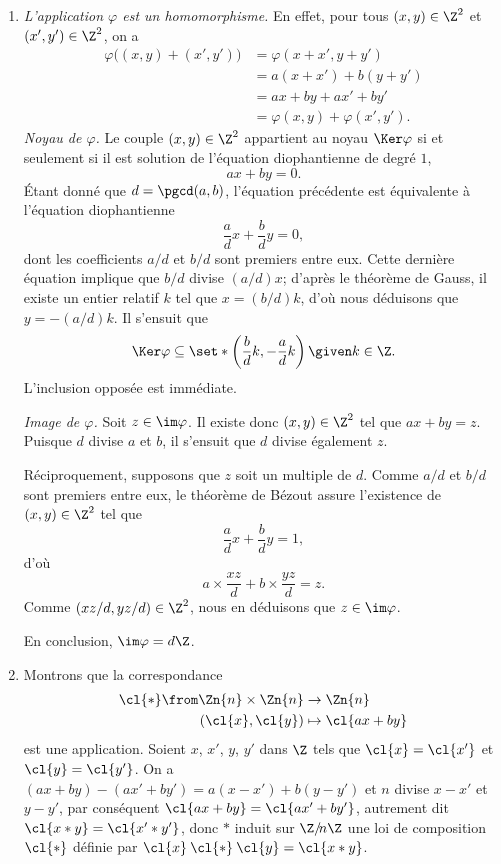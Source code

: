 \begin{enumerate}
  \item %
    \emph{L'application $\varphi$ est un homomorphisme.}
    En effet, pour tous $(x,y)\in\Z^2$ et $(x',y')\in\Z^2$, on a
    \begin{align*}
      \varphi \bigl((x,y)+(x',y')\bigr) 
      &= \varphi(x+x',y+y')  \\
      &= a(x+x')+b(y+y') \\
      &= ax + by + ax' + by' \\
      &= \varphi(x,y) + \varphi(x',y').
    \end{align*}
    \emph{Noyau de $\varphi$.}
    Le couple $(x,y)\in\Z^2$ appartient au noyau $\Ker \varphi$ si et seulement si il est solution de l'équation diophantienne de degré $1$,
    \[
      ax + by = 0.
    \]
    Étant donné que $d = \pgcd(a,b)$, l'équation précédente est équivalente à l'équation diophantienne
    \[
      \frac{a}{d}x + \frac{b}{d}y = 0,
    \]
    dont les coefficients $a/d$ et $b/d$ sont premiers entre eux.
    Cette dernière équation implique que $b/d$ divise $(a/d)x$; d'après le théorème de Gauss, il existe un entier relatif $k$ tel que $x = (b/d) k$, d'où nous déduisons que $y = -(a/d)k$.
    Il s'ensuit que 
    \[
      \Ker \varphi \subseteq \set*{\left(\frac{b}{d}k, -\frac{a}{d}k\right) \given k\in\Z}.
    \]
    L'inclusion opposée est immédiate.

    \emph{Image de $\varphi$.}
    Soit $z\in\im\varphi$. 
    Il existe donc $(x,y)\in\Z^2$ tel que $ax + by = z$.
    Puisque $d$ divise $a$ et $b$, il s'ensuit que $d$ divise également $z$.

    Réciproquement, supposons que $z$ soit un multiple de $d$.
    Comme $a/d$ et $b/d$ sont premiers entre eux, le théorème de Bézout assure l'existence de $(x,y)\in\Z^2$ tel que
    \[
      \frac{a}{d} x + \frac{b}{d} y = 1,
    \]
    d'où
    \[
      a\times  \frac{xz}{d} + b\times \frac{yz}{d} = z.
    \]
    Comme $(xz/d,yz/d)\in\Z^2$, nous en déduisons que $z\in\im\varphi$. 
    
    En conclusion, $\im\varphi = d\Z$.

  \item %
    Montrons que la correspondance
    \begin{align*}
      \mathbin{\cl{*}}\from \Zn{n}\times\Zn{n} & \to\Zn{n} \\
                     (\cl{x},\cl{y}) &\mapsto \cl{ax + by}
    \end{align*}
    est une application. 
    Soient $x$, $x'$, $y$, $y'$ dans $\Z$ tels que $\cl{x} = \cl{x'}$ et $\cl{y} = \cl{y'}$. 
    On a $(ax + by) - (ax' + by') = a(x - x') + b(y - y')$ et $n$ divise $x - x'$ et $y - y'$, par conséquent $\cl{ax + by} = \cl{ax' + by'}$, autrement dit $\cl{x * y} = \cl{x' * y'}$, donc $*$ induit sur $\Z/\!n\Z$ une loi de composition $\mathbin{\cl{*}}$ définie par $\cl{x}\mathbin{\cl{*}}\cl{y} = \cl{x*y}$.


\end{enumerate}
